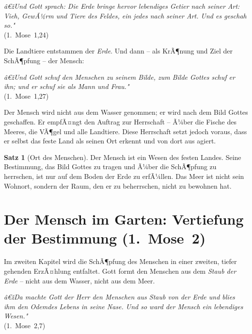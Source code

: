 ﻿\documentclass[a4paper,12pt]{article}
\theoremstyle{definition}
\newtheorem{theorem}{Satz}[section]
\begin{document}
\begin{displayquote}
    \textit{â€žUnd Gott sprach: Die Erde bringe hervor lebendiges Getier nach seiner
    Art: Vieh, GewÃ¼rm und Tiere des Feldes, ein jedes nach seiner Art. Und es
    geschah so."}\\
    \hfill (1.~Mose~1,24)
\end{displayquote}

Die Landtiere entstammen der \textit{Erde}. Und dann -- als KrÃ¶nung und Ziel
der SchÃ¶pfung -- der Mensch:

\begin{displayquote}
    \textit{â€žUnd Gott schuf den Menschen zu seinem Bilde, zum Bilde Gottes schuf
    er ihn; und er schuf sie als Mann und Frau."}\\
    \hfill (1.~Mose~1,27)
\end{displayquote}

Der Mensch wird nicht aus dem Wasser genommen; er wird nach dem Bild Gottes
geschaffen. Er empfÃ¤ngt den Auftrag zur Herrschaft -- Ã¼ber die Fische des Meeres,
die VÃ¶gel und alle Landtiere. Diese Herrschaft setzt jedoch voraus, dass er selbst
das feste Land als seinen Ort erkennt und von dort aus agiert.

\begin{theorem}[Ort des Menschen]
    Der Mensch ist ein Wesen des festen Landes. Seine Bestimmung, das Bild Gottes
    zu tragen und Ã¼ber die SchÃ¶pfung zu herrschen, ist nur auf dem Boden der Erde
    zu erfÃ¼llen. Das Meer ist nicht sein Wohnort, sondern der Raum, den er zu
    beherrschen, nicht zu bewohnen hat.
\end{theorem}

\section{Der Mensch im Garten: Vertiefung der Bestimmung (1.~Mose~2)}

Im zweiten Kapitel wird die SchÃ¶pfung des Menschen in einer zweiten, tiefer
gehenden ErzÃ¤hlung entfaltet. Gott formt den Menschen aus dem \textit{Staub der
Erde} -- nicht aus dem Wasser, nicht aus dem Meer.

\begin{displayquote}
    \textit{â€žDa machte Gott der Herr den Menschen aus Staub von der Erde und
    blies ihm den Odemdes Lebens in seine Nase. Und so ward der Mensch ein
    lebendiges Wesen."}\\
    \hfill (1.~Mose~2,7)
\end{displayquote}
\end{document}
